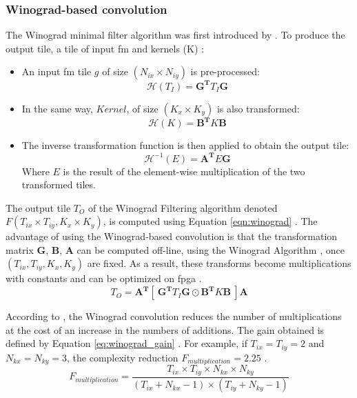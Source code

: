 \subsubsection{Winograd-based convolution}
%
The Winograd minimal filter algorithm was first introduced by \cite{winograd_arithmetic_1980}. To produce the output tile, a tile of input \acrshort{fm} and kernels (K) \cite{abdelouahab_accelerating_2018}:
\begin{itemize}
    \item An input \acrshort{fm} tile $g$ of size $(N_{ix} \times N_{iy})$ is pre-processed: $$\mathcal{H}(T_I) = \boldsymbol{G^{T}} T_I \boldsymbol{G} $$
    \item In the same way, $Kernel$, of size $(K_x \times K_y)$ is also transformed: $$\mathcal{H}(K) = \boldsymbol{B^{T}} K \boldsymbol{B}$$
    \item The inverse transformation function is then applied to obtain the output tile: $$\mathcal{H}^{-1}(E) = \boldsymbol{A^{T}} E \boldsymbol{G}$$ Where $E$ is the result of the element-wise multiplication of the two transformed tiles.
\end{itemize}
The output tile $T_O$ of the Winograd Filtering algorithm denoted $F(T_{ix} \times T_{iy}, K_x \times K_y)$, is computed using Equation \eqref{eqn:winograd} \cite{winograd_arithmetic_1980}. The advantage of using the Winograd-based convolution is that the transformation matrix $\boldsymbol{G}$, $\boldsymbol{B}$, $\boldsymbol{A}$ can be computed off-line, using the Winograd Algorithm \cite{winograd_arithmetic_1980}, once $(T_{ix}, T_{iy}, K_x, K_y)$ are fixed. As a result, these transforms become multiplications with constants and can be optimized on \acrshort{fpga} \cite{liang_evaluating_2020}.
%
\begin{equation}
    T_O = \boldsymbol{A^{T}} [ \ \boldsymbol{G^{T}} T_I \boldsymbol{G} \odot \boldsymbol{B^{T}} K\boldsymbol{B} \ ] \boldsymbol{A}
    \label{eqn:winograd}
\end{equation}

According to \textcite{winograd_arithmetic_1980}, the Winograd convolution reduces the number of multiplications at the cost of an increase in the numbers of additions. The gain obtained is defined by Equation \eqref{eq:winograd_gain} \cite{winograd_arithmetic_1980}. For example, if $T_{ix} = T_{iy} = 2$ and $N_{kx} = N_{ky} = 3$, the complexity reduction $F_{multiplication} = 2.25$ \cite{lavin_fast_2016}.
%
\begin{equation}
    F_{multiplication} = \frac{T_{ix} \times T_{iy} \times N_{kx} \times N_{ky}}{(T_{ix} + N_{kx} - 1) \times (T_{iy} + N_{ky} - 1)}
    \label{eq:winograd_gain}
\end{equation}
%

